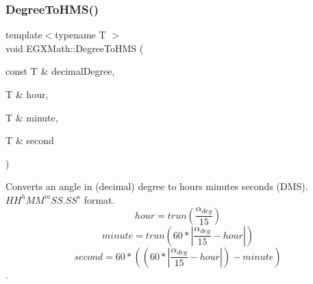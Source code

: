 \subsubsection{\texorpdfstring{Degree\+To\+H\+M\+S()}{DegreeToHMS()}}
{\footnotesize\ttfamily template$<$typename T $>$ \\
void E\+G\+X\+Math\+::\+Degree\+To\+H\+MS (\begin{DoxyParamCaption}\item[{const T \&}]{decimal\+Degree,  }\item[{T \&}]{hour,  }\item[{T \&}]{minute,  }\item[{T \&}]{second }\end{DoxyParamCaption})}



Converts an angle in (decimal) degree to hours minutes seconds (D\+MS). ${HH}^{h}{MM}^{m}{SS.SS}^{s}$ format. \[hour=trun(\frac{\alpha_{deg}}{15})\] \[minute=trun(60 * |\frac{\alpha_{deg}}{15} - hour|)\] \[second=60 * ((60 * |\frac{\alpha_{deg}}{15} - hour|)-minute)\]. 


